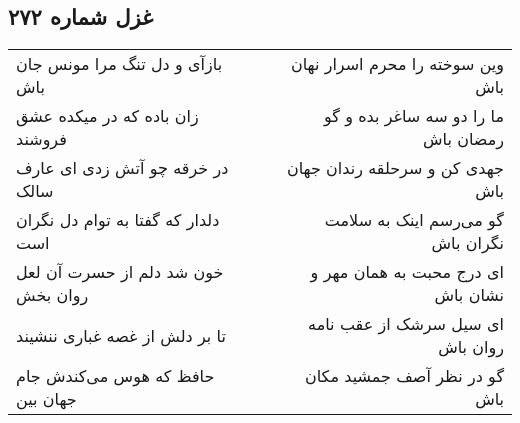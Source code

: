 \begin{center}
\section*{غزل شماره ۲۷۲}
\label{sec:sh272}
\begin{longtable}{l p{0.5cm} r}
بازآی و دل تنگ مرا مونس جان باش
&&
وین سوخته را محرم اسرار نهان باش
\\
زان باده که در میکده عشق فروشند
&&
ما را دو سه ساغر بده و گو رمضان باش
\\
در خرقه چو آتش زدی ای عارف سالک
&&
جهدی کن و سرحلقه رندان جهان باش
\\
دلدار که گفتا به توام دل نگران است
&&
گو می‌رسم اینک به سلامت نگران باش
\\
خون شد دلم از حسرت آن لعل روان بخش
&&
ای درج محبت به همان مهر و نشان باش
\\
تا بر دلش از غصه غباری ننشیند
&&
ای سیل سرشک از عقب نامه روان باش
\\
حافظ که هوس می‌کندش جام جهان بین
&&
گو در نظر آصف جمشید مکان باش
\\
\end{longtable}
\end{center}
